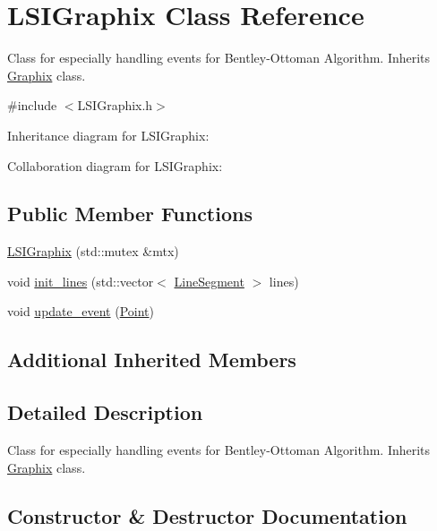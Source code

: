 \hypertarget{classLSIGraphix}{}\section{L\+S\+I\+Graphix Class Reference}
\label{classLSIGraphix}


Class for especially handling events for Bentley-\/\+Ottoman Algorithm. Inherits \hyperlink{classGraphix}{Graphix} class.  




{\ttfamily \#include $<$L\+S\+I\+Graphix.\+h$>$}



Inheritance diagram for L\+S\+I\+Graphix\+:


Collaboration diagram for L\+S\+I\+Graphix\+:
\subsection*{Public Member Functions}
\begin{DoxyCompactItemize}
\item 
\hyperlink{classLSIGraphix_a36adc59a5f2f87571cb230de95e0c0bc}{L\+S\+I\+Graphix} (std\+::mutex \&mtx)
\item 
void \hyperlink{classLSIGraphix_aa95fa264bddca976f974f6eae9173444}{init\+\_\+lines} (std\+::vector$<$ \hyperlink{classLineSegment}{Line\+Segment} $>$ lines)
\item 
void \hyperlink{classLSIGraphix_a136dca7736d6a885ef9b40824808c447}{update\+\_\+event} (\hyperlink{classPoint}{Point})
\end{DoxyCompactItemize}
\subsection*{Additional Inherited Members}


\subsection{Detailed Description}
Class for especially handling events for Bentley-\/\+Ottoman Algorithm. Inherits \hyperlink{classGraphix}{Graphix} class. 

\subsection{Constructor \& Destructor Documentation}
\mbox{\label{classLSIGraphix_a36adc59a5f2f87571cb230de95e0c0bc}} 
